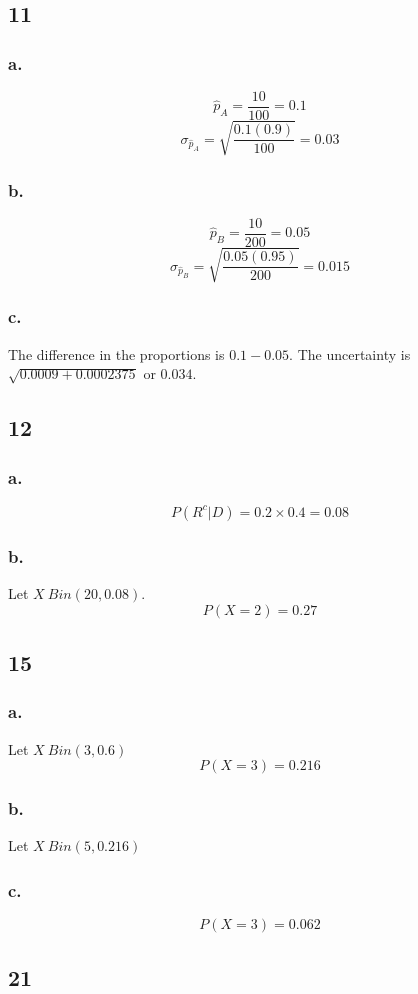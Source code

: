 \documentclass[11pt]{article}
\begin{document}
\subsection*{11}
\subsubsection*{a.}
\[\hat{p}_A = \frac{10}{100} = 0.1 \] 
\[\sigma_{\hat{p}_A} = \sqrt{\frac{0.1(0.9)}{100}} = 0.03 \]
\subsubsection*{b.}
\[\hat{p}_B = \frac{10}{200} = 0.05 \]
\[\sigma_{\hat{p}_B} = \sqrt{\frac{0.05(0.95)}{200}} = 0.015 \]
\subsubsection*{c.}
The difference in the proportions is $0.1 - 0.05$. The uncertainty is
$\sqrt{0.0009 + 0.0002375}$ or $0.034$.
\subsection*{12}
\subsubsection*{a.}
\[ P(R^c|D) = 0.2 \times 0.4 = 0.08 \]
\subsubsection*{b.}
Let $X~Bin(20, 0.08)$.
\[ P(X=2) = 0.27 \]
\subsection*{15}
\subsubsection*{a.}
Let $X~Bin(3, 0.6)$
\[ P(X=3)=0.216 \]
\subsubsection*{b.}
Let $X~Bin(5, 0.216)$
\subsubsection*{c.}
\[ P(X=3) = 0.062 \]

\subsection*{21}
\end{document}
